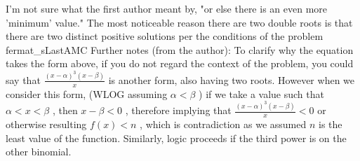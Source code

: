 \documentclass[12pt]{article}
\begin{document}
I'm not sure what the first author meant by, "or else there is an even more 'minimum' value." The most noticeable reason there are two double roots is that there are two distinct positive solutions per the conditions of the problem ~ fermat_sLastAMC Further notes (from the author):
To clarify why the equation takes the form above, if you do not regard the context of the problem, you could say that $\frac{(x-\alpha)^3(x-\beta)}{x}$ is another form, also having two roots. However when we consider this form, (WLOG assuming $\alpha < \beta$ ) if we take a value such that $\alpha < x < \beta$ , then $x-\beta < 0$ , therefore implying that $\frac{(x-\alpha)^3(x-\beta)}{x}<0$ or otherwise resulting $f(x)<n$ , which is contradiction as we assumed $n$ is the least value of the function. Similarly, logic proceeds if the third power is on the other binomial.
\end{document}

